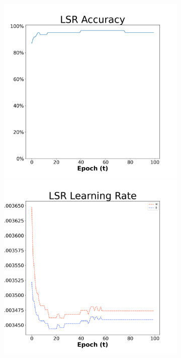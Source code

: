 \begin{figure}[H]
    \centering %
\begin{subfigure}{0.3\textwidth}
  \includegraphics[width=\linewidth]{images/exper1/breast/LSR_0.01_acc.png}
    \includegraphics[width=\linewidth]{images/exper1/breast/LSR_0.01_lr.png}

\end{subfigure}
\end{figure}
